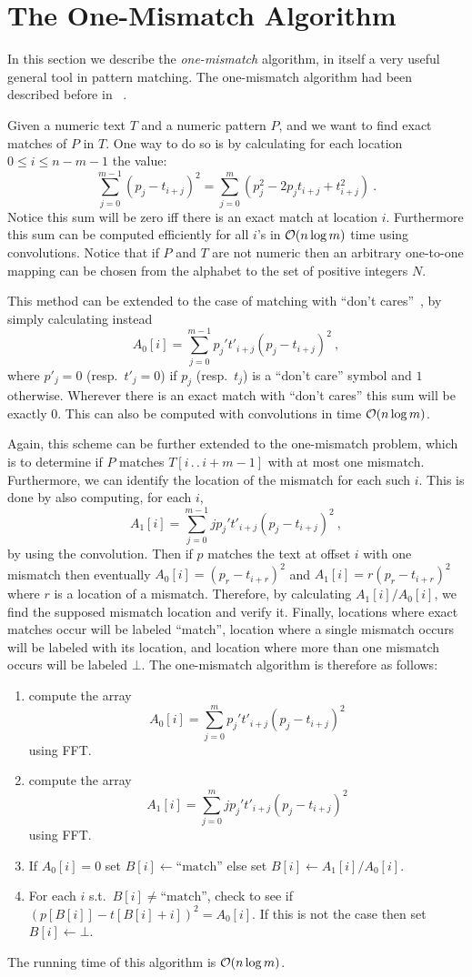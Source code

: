 \documentclass[11pt]{article}
\newcommand{\calO}{{\cal{O}}}
\newcommand{\ldotdot}{\,.\,.\,}
\begin{document}
\section{The One-Mismatch Algorithm}
In this section we describe the \emph{one-mismatch} algorithm,
in itself a very useful general tool in pattern matching. The
one-mismatch algorithm had been described before in
~\cite{CC07,CPER07}.

Given a numeric text $T$ and a numeric pattern $P$, and we want to
find exact matches of $P$ in $T$. One way to do so is by
calculating for each location $0\leq i \leq n-m-1$ the value:
\[
    \sum_{j=0}^{m-1}(p_j-t_{i+j})^2=\sum_{j=0}^m(p_j^2-2p_jt_{i+j}+t_{i+j}^2)\
    .
\]
Notice this sum will be zero iff there is an exact match at location
$i$. Furthermore this sum can be computed efficiently for all $i$'s
in $\calO(n\log{m})$ time using convolutions.  Notice that if $P$
and $T$ are not numeric then an arbitrary one-to-one mapping can be
chosen from the alphabet to the set of positive integers
${{N}}$.

This method can be extended to the case of matching with ``don't
cares''~\cite{CC07}, by simply calculating instead
\[
    A_0[i]= \sum_{j=0}^{m-1} p_j't'_{i+j}(p_j-t_{i+j})^2\ ,
\]
where $p'_j=0$ (resp.\ $t'_j=0$) if $p_j$ (resp.\ $t_j$) is a ``don't
care'' symbol and $1$ otherwise. Wherever there is an exact match with
``don't cares'' this sum will be exactly $0$. This can also be computed
with convolutions in time $\calO(n\log{m})$.

Again, this scheme can be further extended to the one-mismatch
problem, which is to determine if $P$ matches $T[i\ldotdot i+m-1]$
with at most one mismatch. Furthermore, we can identify the location
of the mismatch for each such $i$. This is done by also computing,
for each $i$,
\[
    A_1[i]=\sum_{j=0}^{m-1} jp_j't'_{i+j}(p_j-t_{i+j})^2\ ,
\]
by using the convolution. Then if $p$ matches the text at offset
$i$ with one mismatch then eventually $A_0[i]=(p_r-t_{i+r})^2$ and
$A_1[i]=r(p_r-t_{i+r})^2$ where $r$ is a location of a mismatch.
Therefore, by calculating $A_1[i]/A_0[i]$, we find the supposed
mismatch location and verify it. Finally, locations where exact
matches occur will be labeled ``match'', location where a single
mismatch occurs will be labeled with its location, and location
where more than one mismatch occurs will be labeled $\bot$. The
one-mismatch algorithm is therefore as follows:
\begin{enumerate}
    \item compute the array     $$A_0[i]= \sum_{j=0}^m
    p_j't'_{i+j}(p_j-t_{i+j})^2$$ using FFT.
    \item  compute the array $$A_1[i]=\sum_{j=0}^m
    jp_j't'_{i+j}(p_j-t_{i+j})^2$$ using FFT.
    \item  If $A_0[i] = 0$ set $B[i]\gets\mbox{``match''}$ else set
    $B[i]\gets A_1[i]/A_0[i]$.
    \item For each $i$ s.t.\ $B[i]\neq \mbox{``match''}$, check to see if
    $(p[B[i]]-t[B[i]+i])^2=A_0[i]$. If this is not the case then
    set $B[i]\gets \bot$.
\end{enumerate}
The running time of this algorithm is $\calO(n\log{m})$.
\end{document}
